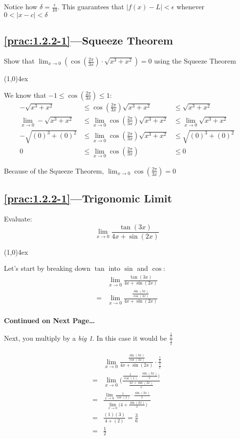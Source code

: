 \documentclass{MathNotes}
\newcommand{\continued}{
	\mbox{}
	\vfill
	\textbf{Continued on Next Page\ldots}\newpage
}
\newcommand{\br}{
	\begin{center}
		\line(1,0){4ex}
	\end{center}}
\begin{document}
Notice how $\delta=\frac{\epsilon}{10}$. This guarantees that
$\lvert f(x)-L \rvert < \epsilon$ whenever $0<\lvert x-c \rvert<\delta$

\subsection*{\ref{prac:1.2.2-1}---Squeeze Theorem}\label{ans:1.2.2-1}
Show that
$\displaystyle\lim_{x\to 0}(\cos(\frac{2\pi}{3x})\cdot\sqrt{x^3+x^2})=0$
using the Squeeze Theorem
\br
We know that $\displaystyle-1\leq\cos(\frac{2\pi}{3x})\leq 1$:
\begin{align*}
	-\sqrt{x^3+x^2}              & \leq\cos(\frac{2\pi}{3x})\sqrt{x^3+x^2} & \leq
	\sqrt{x^3+x^2}
	\\
	\lim_{x\to 0}-\sqrt{x^3+x^2} & \leq\lim_{x\to 0}\cos(\frac{2\pi}{3x})
	\sqrt{x^3+x^2}               & \leq\lim_{x\to 0}\sqrt{x^3+x^2}
	\\
	-\sqrt{(0)^3+(0)^2}          & \leq\lim_{x\to 0}\cos(\frac{2\pi}{3x})
	\sqrt{x^3+x^2}               & \leq\sqrt{(0)^3+(0)^2}
	\\
	0                            & \leq\lim_{x\to 0}\cos(\frac{2\pi}{3x})  & \leq0
\end{align*}

Because of the Squeeze Theorem, $\displaystyle\lim_{x\to 0}\cos(\frac{2\pi}{3x})=0$

\subsection*{\ref{prac:1.2.2-1}---Trigonomic Limit}\label{ans:1.2.2-2}
Evaluate:
$$\lim_{x\to 0}\frac{\tan(3x)}{4x+\sin(2x)}$$
\br

Let's start by breaking down $\tan$ into $\sin$ and $\cos$:
\begin{align*}
	  & \lim_{x\to 0}\frac{\tan(3x)}{4x+\sin(2x)}                  \\
	= & \lim_{x\to 0}\frac{\frac{\sin(3x)}{\cos(3x)}}{4x+\sin(2x)} \\
\end{align*}
\continued

Next, you multiply by a \textit{big 1}. In this case it would be
$\displaystyle\frac{\frac{1}{x}}{\frac{1}{x}}$

\begin{align*}
	  & \lim_{x\to 0}\frac{\frac{\sin(3x)}{\cos(3x)}}{4x+\sin(2x)}\cdot\frac{\frac{1}{x}}{\frac{1}{x}}            \\
	= & \lim_{x\to 0}\big(\frac{\frac{1}{\cos(x)}\cdot\frac{\sin(3x)}{x}\big)}{\frac{4x+\sin(2x)}{x}}             \\
	= & \frac{\lim_{x\to 0}\frac{1}{\cos(x)}\cdot\frac{\sin(3x)}{x}}{\lim_{x\to 0}\big(4+\frac{\sin(2x)}{x}\big)} \\
	= & \frac{(1)(3)}{4+(2)}=\frac{3}{6}                                                                          \\
	= & \frac{1}{2}
\end{align*}
\end{document}
